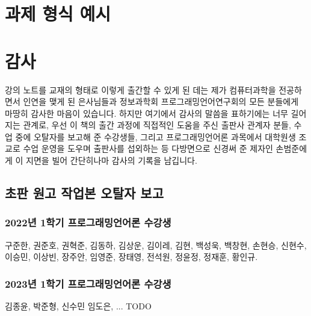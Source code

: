 \printbibliography[title=참고문헌]

\AppendixTitleToToc
\AttachAppendixTitleToSecnum

\appendix
\appendixpage*


\section{과제 형식 예시}


\newpage

\section{감사}
강의 노트를 교재의 형태로 이렇게 출간할 수 있게 된 데는 제가 컴퓨터과학을 전공하면서
인연을 맺게 된 은사님들과 정보과학회 프로그래밍언어연구회의 모든 분들에게 마땅히 감사한 마음이 있습니다.
하지만 여기에서 감사의 말씀을 표하기에는 너무 길어지는 관계로,
우선 이 책의 출간 과정에 직접적인 도움을 주신 출판사 관계자 분들,
수업 중에 오탈자를 보고해 준 수강생들, 그리고 프로그래밍언어론 과목에서
대학원생 조교로 수업 운영을 도우며 출판사를 섭외하는 등 다방면으로
신경써 준 제자인 손범준에게 이 지면을 빌어 간단히나마 감사의 기록을 남깁니다.

\subsection{초판 원고 작업본 오탈자 보고}
\subsubsection{2022년 1학기 프로그래밍언어론 수강생}
구준한,
권준호,
권혁준,
김동하,
김상운,
김이레,
김현,
백성욱,
백창현,
손현승,
신현수,
이승민,
이상빈,
장주안,
임영준,
장태영,
전석원,
정윤정,
정재훈,
황인규.
\subsubsection{2023년 1학기 프로그래밍언어론 수강생}
김종윤,
박준형,
신수민
임도은,
... TODO

